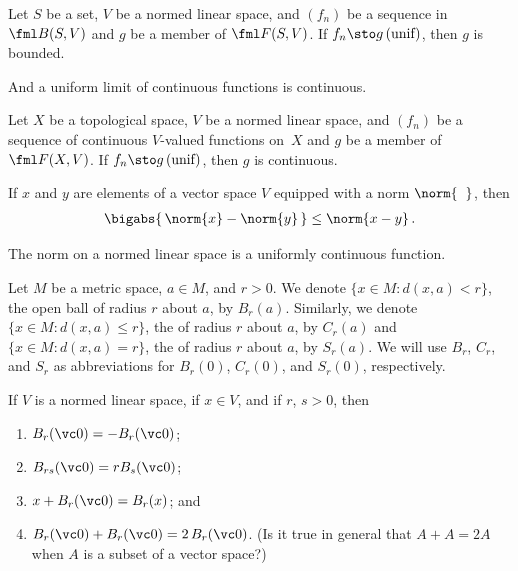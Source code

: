 \begin{prop}\label{C023151} Let $S$ be a set, $V$ be a normed linear space, and $(f_n)$ be a
sequence in $\fml B(S,V)$ and $g$ be a member of $\fml F(S,V)$.  If $f_n \sto g\text{\,(unif)}$,
then $g$ is bounded.
\end{prop}

And a uniform limit of continuous functions is continuous.

\begin{prop}\label{C023154} Let $X$ be a topological space, $V$ be a normed linear space, and
$(f_n)$ be a sequence of continuous $V$-valued functions on~$X$ and $g$ be a member of $\fml F(X,V)$.  If $f_n
\sto g\text{\,(unif)}$, then $g$ is continuous.
\end{prop}

\begin{prop}\label{C023163} If $x$ and $y$ are elements of a vector space $V$ equipped with a
norm $\norm{\hphantom{x}}$, then
  \[ \bigabs{\strut\,\norm{x} - \norm{y}\,} \le \norm{x - y}\,. \]
\end{prop}

\begin{cor} The norm on a normed linear space is a uniformly continuous function.
\end{cor}

\begin{notn} Let $M$ be a metric space, $a \in M$, and $r > 0$.  We denote $\{x \in M\colon d(x,a) < r\}$, the
open ball of radius $r$ about $a$, by $B_r(a)$.  Similarly, we denote $\{x \in M\colon d(x,a) \le r\}$, the
 of radius $r$ about $a$, by $C_r(a)$ and $\{x \in M\colon d(x,a) = r\}$, the
 of radius $r$ about $a$, by $S_r(a)$.  We will use $B_r$, $C_r$, and $S_r$ as abbreviations for $B_r(0)$, $C_r(0)$,
and $S_r(0)$, respectively.
\end{notn}

\begin{prop} If $V$ is a normed linear space, if $x \in V$, and if $r$, $s > 0$, then
 \begin{enumerate}[label=\rm{(\alph*)}]
   \item $B_r(\vc 0) = -B_r(\vc 0)$;
   \item $B_{rs}(\vc 0) = rB_s(\vc 0)$;
   \item $x + B_r(\vc 0) = B_r(x)$; and
   \item $B_r(\vc 0) + B_r(\vc 0) = 2\,B_r(\vc 0)$.  (Is it true in general that
$A + A = 2A$ when $A$ is a subset of a vector space?)
 \end{enumerate}
\end{prop}

